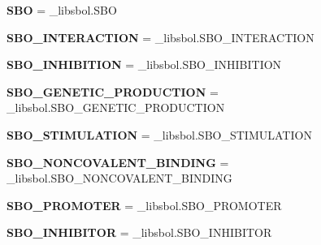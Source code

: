 \begin{DoxyCompactItemize}
\item 
{\bfseries S\+BO} = \+\_\+libsbol.\+S\+BO\hypertarget{namespacesbol_1_1libsbol_a8d9d8652cdc6b4bcb3ad682b5cfe21cc}{}\label{namespacesbol_1_1libsbol_a8d9d8652cdc6b4bcb3ad682b5cfe21cc}

\item 
{\bfseries S\+B\+O\+\_\+\+I\+N\+T\+E\+R\+A\+C\+T\+I\+ON} = \+\_\+libsbol.\+S\+B\+O\+\_\+\+I\+N\+T\+E\+R\+A\+C\+T\+I\+ON\hypertarget{namespacesbol_1_1libsbol_a7b6706559fb94e371fba2d6790c58540}{}\label{namespacesbol_1_1libsbol_a7b6706559fb94e371fba2d6790c58540}

\item 
{\bfseries S\+B\+O\+\_\+\+I\+N\+H\+I\+B\+I\+T\+I\+ON} = \+\_\+libsbol.\+S\+B\+O\+\_\+\+I\+N\+H\+I\+B\+I\+T\+I\+ON\hypertarget{namespacesbol_1_1libsbol_ae193376edc64a4d65ca86eadd295a197}{}\label{namespacesbol_1_1libsbol_ae193376edc64a4d65ca86eadd295a197}

\item 
{\bfseries S\+B\+O\+\_\+\+G\+E\+N\+E\+T\+I\+C\+\_\+\+P\+R\+O\+D\+U\+C\+T\+I\+ON} = \+\_\+libsbol.\+S\+B\+O\+\_\+\+G\+E\+N\+E\+T\+I\+C\+\_\+\+P\+R\+O\+D\+U\+C\+T\+I\+ON\hypertarget{namespacesbol_1_1libsbol_a18f31587c96f7ffd52493f435360b761}{}\label{namespacesbol_1_1libsbol_a18f31587c96f7ffd52493f435360b761}

\item 
{\bfseries S\+B\+O\+\_\+\+S\+T\+I\+M\+U\+L\+A\+T\+I\+ON} = \+\_\+libsbol.\+S\+B\+O\+\_\+\+S\+T\+I\+M\+U\+L\+A\+T\+I\+ON\hypertarget{namespacesbol_1_1libsbol_ad297ff540fb94214ae14cd08b6775171}{}\label{namespacesbol_1_1libsbol_ad297ff540fb94214ae14cd08b6775171}

\item 
{\bfseries S\+B\+O\+\_\+\+N\+O\+N\+C\+O\+V\+A\+L\+E\+N\+T\+\_\+\+B\+I\+N\+D\+I\+NG} = \+\_\+libsbol.\+S\+B\+O\+\_\+\+N\+O\+N\+C\+O\+V\+A\+L\+E\+N\+T\+\_\+\+B\+I\+N\+D\+I\+NG\hypertarget{namespacesbol_1_1libsbol_a5a55e3b945103e86532f73ebdc39dbee}{}\label{namespacesbol_1_1libsbol_a5a55e3b945103e86532f73ebdc39dbee}

\item 
{\bfseries S\+B\+O\+\_\+\+P\+R\+O\+M\+O\+T\+ER} = \+\_\+libsbol.\+S\+B\+O\+\_\+\+P\+R\+O\+M\+O\+T\+ER\hypertarget{namespacesbol_1_1libsbol_a0b72390c8f5eed603fd3b234a374e62f}{}\label{namespacesbol_1_1libsbol_a0b72390c8f5eed603fd3b234a374e62f}

\item 
{\bfseries S\+B\+O\+\_\+\+I\+N\+H\+I\+B\+I\+T\+OR} = \+\_\+libsbol.\+S\+B\+O\+\_\+\+I\+N\+H\+I\+B\+I\+T\+OR\hypertarget{namespacesbol_1_1libsbol_a7e31c92b5313821b30693c6c53c2c2b5}{}\label{namespacesbol_1_1libsbol_a7e31c92b5313821b30693c6c53c2c2b5}


\end{DoxyCompactItemize}
